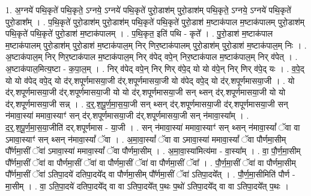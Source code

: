\documentclass[17pt]{extarticle}
\begin{document}
1. अ॒ग्नये॑ पथि॒कृते॑ पथि॒कृते॒ ऽग्नये॒ ऽग्नये॑ पथि॒कृते॑ पुरो॒डाश॑म् पुरो॒डाश॑म् पथि॒कृते॒ ऽग्नये॒ ऽग्नये॑ पथि॒कृते॑ पुरो॒डाश᳚म् । . प॒थि॒कृते॑ पुरो॒डाश॑म् पुरो॒डाश॑म् पथि॒कृते॑ पथि॒कृते॑ पुरो॒डाश॑ म॒ष्टाक॑पाल म॒ष्टाक॑पालम् पुरो॒डाश॑म् पथि॒कृते॑ पथि॒कृते॑ पुरो॒डाश॑ म॒ष्टाक॑पालम् । . प॒थि॒कृत॒ इति॑ पथि - कृते᳚ । . पु॒रो॒डाश॑ म॒ष्टाक॑पाल म॒ष्टाक॑पालम् पुरो॒डाश॑म् पुरो॒डाश॑ म॒ष्टाक॑पाल॒म् निर् णिर॒ष्टाक॑पालम् पुरो॒डाश॑म् पुरो॒डाश॑ म॒ष्टाक॑पाल॒म् निः । . अ॒ष्टाक॑पाल॒म् निर् णिर॒ष्टाक॑पाल म॒ष्टाक॑पाल॒म् निर् व॑पेद् वपे॒न् निर॒ष्टाक॑पाल म॒ष्टाक॑पाल॒म् निर् व॑पेत् । . अ॒ष्टाक॑पाल॒मित्य॒ष्टा - क॒पा॒ल॒म् । . निर् व॑पेद् वपे॒न् निर् णिर् व॑पे॒द् यो यो व॑पे॒न् निर् णिर् व॑पे॒द् यः । . व॒पे॒द् यो यो व॑पेद् वपे॒द् यो द॑र्.शपूर्णमासया॒जी द॑र्.शपूर्णमासया॒जी यो व॑पेद् वपे॒द् यो द॑र्.शपूर्णमासया॒जी । . यो द॑र्.शपूर्णमासया॒जी द॑र्.शपूर्णमासया॒जी यो यो द॑र्.शपूर्णमासया॒जी सन् थ्सन् द॑र्.शपूर्णमासया॒जी यो यो द॑र्.शपूर्णमासया॒जी सन्न् । . द॒र्॒.श॒पू॒र्ण॒मा॒स॒या॒जी सन् थ्सन् द॑र्.शपूर्णमासया॒जी द॑र्.शपूर्णमासया॒जी सन् न॑मावा॒स्या॑ ममावा॒स्याꣳ॑ सन् द॑र्.शपूर्णमासया॒जी द॑र्.शपूर्णमासया॒जी सन् न॑मावा॒स्या᳚म् । . द॒र्॒.श॒पू॒र्ण॒मा॒स॒या॒जीति॑ दर्.शपूर्णमास - या॒जी । . सन् न॑मावा॒स्या॑ ममावा॒स्याꣳ॑ सन् थ्सन् न॑मावा॒स्यां᳚ ॅवा वा ऽमावा॒स्याꣳ॑ सन् थ्सन् न॑मावा॒स्यां᳚ ॅवा । . अ॒मा॒वा॒स्यां᳚ ॅवा वा ऽमावा॒स्या॑ ममावा॒स्यां᳚ ॅवा पौर्णमा॒सीम् पौ᳚र्णमा॒सीं ॅवा॑ ऽमावा॒स्या॑ ममावा॒स्यां᳚ ॅवा पौर्णमा॒सीम् । . अ॒मा॒वा॒स्या॑मित्य॑मा - वा॒स्या᳚म् । . वा॒ पौ॒र्ण॒मा॒सीम् पौ᳚र्णमा॒सीं ॅवा॑ वा पौर्णमा॒सीं ॅवा॑ वा पौर्णमा॒सीं ॅवा॑ वा पौर्णमा॒सीं ॅवा᳚ । . पौ॒र्ण॒मा॒सीं ॅवा॑ वा पौर्णमा॒सीम् पौ᳚र्णमा॒सीं ॅवा॑ ऽतिपा॒दये॑ दतिपा॒दये᳚द् वा पौर्णमा॒सीम् पौ᳚र्णमा॒सीं ॅवा॑ ऽतिपा॒दये᳚त् । . पौ॒र्ण॒मा॒सीमिति॑ पौर्ण - मा॒सीम् । . वा॒ ऽति॒पा॒दये॑ दतिपा॒दये᳚द् वा वा ऽतिपा॒दये᳚त् प॒थः प॒थो॑ ऽतिपा॒दये᳚द् वा वा ऽतिपा॒दये᳚त् प॒थः । \newline
\end{document}
